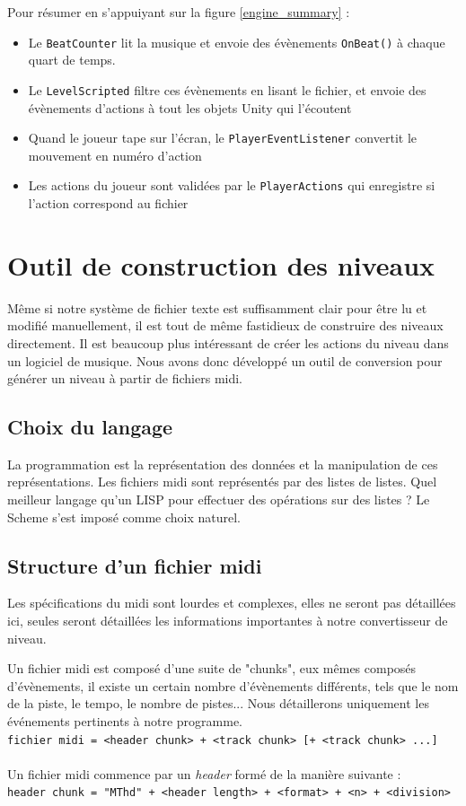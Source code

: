 Pour résumer en s'appuiyant sur la figure \ref{engine_summary} :
\begin{itemize}
\item Le \texttt{BeatCounter} lit la musique et envoie des évènements \texttt{OnBeat()} à chaque quart de temps.
\item Le \texttt{LevelScripted} filtre ces évènements en lisant le fichier, et envoie des évènements d'actions à tout les objets Unity qui l'écoutent
\item Quand le joueur tape sur l'écran, le \texttt{PlayerEventListener} convertit le mouvement en numéro d'action
\item Les actions du joueur sont validées par le \texttt{PlayerActions} qui enregistre si l'action correspond au fichier
\end{itemize}

\section{Outil de construction des niveaux}

Même si notre système de fichier texte est suffisamment clair pour être lu et modifié manuellement, il est tout de même fastidieux de construire des niveaux directement. Il est beaucoup plus intéressant de créer les actions du niveau dans un logiciel de musique. Nous avons donc développé un outil de conversion pour générer un niveau à partir de fichiers midi.

\subsection{Choix du langage}
La programmation est la représentation des données et la manipulation de ces représentations. Les fichiers midi sont représentés par des listes de listes. Quel meilleur langage qu'un LISP pour effectuer des opérations sur des listes ? Le Scheme s'est imposé comme choix naturel.

\subsection{Structure d'un fichier midi}
Les spécifications du midi sont lourdes et complexes, elles ne seront pas détaillées ici, seules seront détaillées les informations importantes à notre convertisseur de niveau.

Un fichier midi est composé d'une suite de "chunks", eux mêmes composés d'évènements, il existe un certain nombre d'évènements différents, tels que le nom de la piste, le tempo, le nombre de pistes... Nous détaillerons uniquement les événements pertinents à notre programme.\\
{\small \texttt{fichier midi = <header chunk> + <track chunk> [+ <track chunk> ...]}}\\\\
Un fichier midi commence par un \textit{header} formé de la manière suivante :\\
{\small \texttt{header chunk = "MThd" + <header length> + <format> + <n> + <division>}}\\

